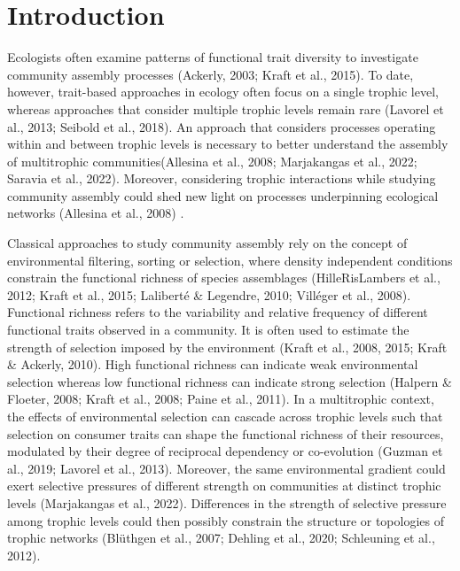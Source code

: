 \documentclass[
]{agujournal2019}
\begin{document}
\section{Introduction}\label{introduction}

Ecologists often examine patterns of functional trait diversity to
investigate community assembly processes (Ackerly, 2003; Kraft et al.,
2015). To date, however, trait-based approaches in ecology often focus
on a single trophic level, whereas approaches that consider multiple
trophic levels remain rare (Lavorel et al., 2013; Seibold et al., 2018).
An approach that considers processes operating within and between
trophic levels is necessary to better understand the assembly of
multitrophic communities(Allesina et al., 2008; Marjakangas et al.,
2022; Saravia et al., 2022). Moreover, considering trophic interactions
while studying community assembly could shed new light on processes
underpinning ecological networks (Allesina et al., 2008) .

Classical approaches to study community assembly rely on the concept of
environmental filtering, sorting or selection, where density independent
conditions constrain the functional richness of species assemblages
(HilleRisLambers et al., 2012; Kraft et al., 2015; Laliberté \&
Legendre, 2010; Villéger et al., 2008). Functional richness refers to
the variability and relative frequency of different functional traits
observed in a community. It is often used to estimate the strength of
selection imposed by the environment (Kraft et al., 2008, 2015; Kraft \&
Ackerly, 2010). High functional richness can indicate weak environmental
selection whereas low functional richness can indicate strong selection
(Halpern \& Floeter, 2008; Kraft et al., 2008; Paine et al., 2011). In a
multitrophic context, the effects of environmental selection can cascade
across trophic levels such that selection on consumer traits can shape
the functional richness of their resources, modulated by their degree of
reciprocal dependency or co-evolution (Guzman et al., 2019; Lavorel et
al., 2013). Moreover, the same environmental gradient could exert
selective pressures of different strength on communities at distinct
trophic levels (Marjakangas et al., 2022). Differences in the strength
of selective pressure among trophic levels could then possibly constrain
the structure or topologies of trophic networks (Blüthgen et al., 2007;
Dehling et al., 2020; Schleuning et al., 2012).
\end{document}
